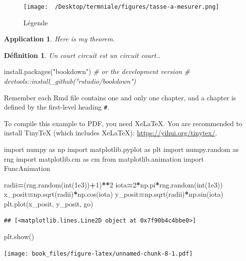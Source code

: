 \documentclass[
]{book}
\newenvironment{Shaded}{\begin{snugshade}}{\end{snugshade}}
\newcommand{\BuiltInTok}[1]{#1}
\newcommand{\CommentTok}[1]{\textcolor[rgb]{0.56,0.35,0.01}{\textit{#1}}}
\newcommand{\DecValTok}[1]{\textcolor[rgb]{0.00,0.00,0.81}{#1}}
\newcommand{\FloatTok}[1]{\textcolor[rgb]{0.00,0.00,0.81}{#1}}
\newcommand{\FunctionTok}[1]{\textcolor[rgb]{0.00,0.00,0.00}{#1}}
\newcommand{\ImportTok}[1]{#1}
\newcommand{\NormalTok}[1]{#1}
\newcommand{\OperatorTok}[1]{\textcolor[rgb]{0.81,0.36,0.00}{\textbf{#1}}}
\newcommand{\StringTok}[1]{\textcolor[rgb]{0.31,0.60,0.02}{#1}}
\newtheorem{definition}{Définition}
\newtheorem{theorem}{Application}
\begin{document}
\begin{figure}
\centering
\texttt{[image: ~/Desktop/termniale/figures/tasse-a-mesurer.png]}
\caption{Légende}
\end{figure}

\begin{theorem}
\protect\hypertarget{thm:unnamed-chunk-5}{}{\label{thm:unnamed-chunk-5} }Here is my theorem.
\end{theorem}

\begin{definition}
\protect\hypertarget{def:unnamed-chunk-6}{}{\label{def:unnamed-chunk-6} }Un court circuit est un circuit court..
\end{definition}

\begin{Shaded}
\begin{Highlighting}[]
\FunctionTok{install.packages}\NormalTok{(}\StringTok{"bookdown"}\NormalTok{)}
\CommentTok{\# or the development version}
\CommentTok{\# devtools::install\_github("rstudio/bookdown")}
\end{Highlighting}
\end{Shaded}

Remember each Rmd file contains one and only one chapter, and a chapter is defined by the first-level heading \texttt{\#}.

To compile this example to PDF, you need XeLaTeX. You are recommended to install TinyTeX (which includes XeLaTeX): \url{https://yihui.org/tinytex/}.

\begin{Shaded}
\begin{Highlighting}[]
\ImportTok{import}\NormalTok{ numpy }\ImportTok{as}\NormalTok{ np}
\ImportTok{import}\NormalTok{ matplotlib.pyplot }\ImportTok{as}\NormalTok{ plt}
\ImportTok{import}\NormalTok{ numpy.random }\ImportTok{as}\NormalTok{ rng}
\ImportTok{import}\NormalTok{ matplotlib.cm }\ImportTok{as}\NormalTok{ cm}
\ImportTok{from}\NormalTok{ matplotlib.animation }\ImportTok{import}\NormalTok{ FuncAnimation}

\NormalTok{radii}\OperatorTok{=}\NormalTok{(rng.random(}\BuiltInTok{int}\NormalTok{(}\FloatTok{1e3}\NormalTok{))}\OperatorTok{+}\DecValTok{1}\NormalTok{)}\OperatorTok{**}\DecValTok{2}
\NormalTok{iota}\OperatorTok{=}\DecValTok{2}\OperatorTok{*}\NormalTok{np.pi}\OperatorTok{*}\NormalTok{rng.random(}\BuiltInTok{int}\NormalTok{(}\FloatTok{1e3}\NormalTok{))}
\NormalTok{x\_posit}\OperatorTok{=}\NormalTok{np.sqrt(radii)}\OperatorTok{*}\NormalTok{np.cos(iota)}
\NormalTok{y\_posit}\OperatorTok{=}\NormalTok{np.sqrt(radii)}\OperatorTok{*}\NormalTok{np.sin(iota)}
\NormalTok{plt.plot(x\_posit, y\_posit, }\StringTok{\textquotesingle{}go\textquotesingle{}}\NormalTok{)}
\end{Highlighting}
\end{Shaded}

\begin{verbatim}
## [<matplotlib.lines.Line2D object at 0x7f90b4c4bbe0>]
\end{verbatim}

\begin{Shaded}
\begin{Highlighting}[]
\NormalTok{plt.show()}
\end{Highlighting}
\end{Shaded}

\texttt{[image: book\_files/figure-latex/unnamed-chunk-8-1.pdf]}

  
\end{document}
